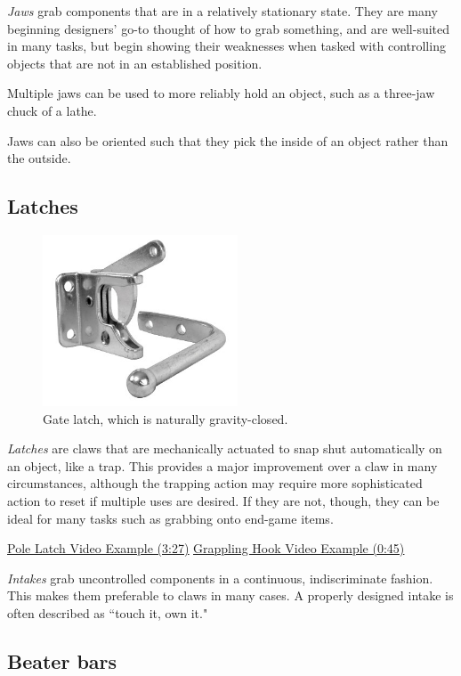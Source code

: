 \textit{Jaws} grab components that are in a relatively stationary state. They are many beginning designers' go-to thought of how to grab something, and are well-suited in many tasks, but begin showing their weaknesses when tasked with controlling objects that are not in an established position.

Multiple jaws can be used to more reliably hold an object, such as a three-jaw chuck of a lathe.

Jaws can also be oriented such that they pick the inside of an object rather than the outside.

\subsection{Latches}


\begin{figure}[H]
	\includegraphics[height=2in]{imgs/gate_latch.jpeg}
	\caption{Gate latch, which is naturally gravity-closed.}
\end{figure}

\textit{Latches} are claws that are mechanically actuated to snap shut automatically on an object, like a trap. This provides a major improvement over a claw in many circumstances, although the trapping action may require more sophisticated action to reset if multiple uses are desired. If they are not, though, they can be ideal for many tasks such as grabbing onto end-game items.

\href{https://youtu.be/_hTyXQUgYLE?t=207}{\color{red}\underline{Pole Latch Video Example (3:27)}}
\href{https://youtu.be/sWHwDfpeYjo?t=45}{\color{red}\underline{Grappling Hook Video Example (0:45)}}

\textit{Intakes} grab uncontrolled components in a continuous, indiscriminate fashion. This makes them preferable to claws in many cases. A properly designed intake is often described as ``touch it, own it."

\subsection{Beater bars} 


